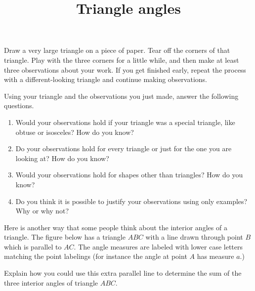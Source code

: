 \documentclass[nooutcomes,noauthor]{ximera}
\title{Triangle angles}
\begin{document}
\begin{abstract}
\end{abstract}

\maketitle

\begin{problem}
Draw a very large triangle on a piece of paper. Tear off the corners of that triangle. Play with the three corners for a little while, and then make at least three observations about your work. If you get finished early, repeat the process with a different-looking triangle and continue making observations.
\end{problem}

\begin{problem}
Using your triangle and the observations you just made, answer the following questions.
\begin{enumerate}
\item Would your observations hold if your triangle was a special triangle, like obtuse or isosceles? How do you know?
\item Do your observations hold for every triangle or just for the one you are looking at? How do you know?
\item Would your observations hold for shapes other than triangles? How do you know?
\item Do you think it is possible to justify your observations using only examples? Why or why not?
\end{enumerate}
\end{problem}

\newpage

\begin{problem}
Here is another way that some people think about the interior angles of a triangle. The figure below has a triangle $ABC$ with a line drawn through point $B$ which is parallel to $AC$. The angle measures are labeled with lower case letters matching the point labelings (for instance the angle at point $A$ has measure $a$.) 
\begin{image}
\end{image}

Explain how you could use this extra parallel line to determine the sum of the three interior angles of triangle $ABC$.

\end{problem}
\end{document}
